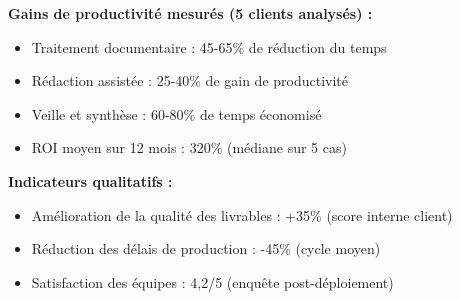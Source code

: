 \textbf{Gains de productivité mesurés (5 clients analysés) :}
\begin{itemize}
    \item Traitement documentaire : 45-65\% de réduction du temps
    \item Rédaction assistée : 25-40\% de gain de productivité
    \item Veille et synthèse : 60-80\% de temps économisé
    \item ROI moyen sur 12 mois : 320\% (médiane sur 5 cas)
\end{itemize}

\textbf{Indicateurs qualitatifs :}
\begin{itemize}
    \item Amélioration de la qualité des livrables : +35\% (score interne client)
    \item Réduction des délais de production : -45\% (cycle moyen)
    \item Satisfaction des équipes : 4,2/5 (enquête post-déploiement)
\end{itemize}
